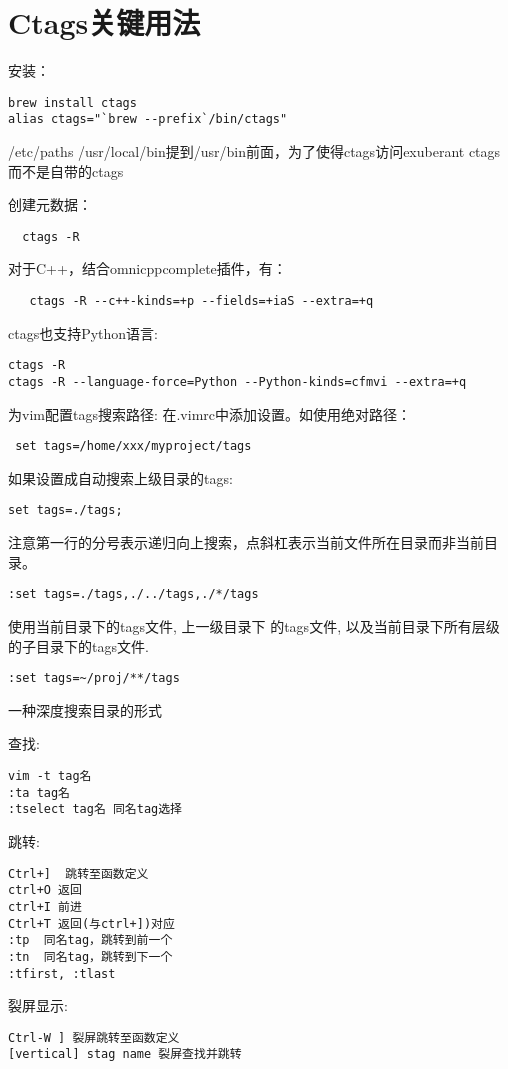 
\section{Ctags关键用法}

安装：
\begin{verbatim}
brew install ctags
alias ctags="`brew --prefix`/bin/ctags"
\end{verbatim}

/etc/paths /usr/local/bin提到/usr/bin前面，为了使得ctags访问exuberant ctags而不是自带的ctags


创建元数据：
\begin{verbatim}
  ctags -R
\end{verbatim}
  对于C++，结合omnicppcomplete插件，有：
\begin{verbatim}
   ctags -R --c++-kinds=+p --fields=+iaS --extra=+q
\end{verbatim}
ctags也支持Python语言:
\begin{verbatim}
ctags -R
ctags -R --language-force=Python --Python-kinds=cfmvi --extra=+q
\end{verbatim}

为vim配置tags搜索路径:
在.vimrc中添加设置。如使用绝对路径：
\begin{verbatim}
 set tags=/home/xxx/myproject/tags
\end{verbatim}

如果设置成自动搜索上级目录的tags:
\begin{verbatim}
set tags=./tags;
\end{verbatim}
注意第一行的分号表示递归向上搜索，点斜杠表示当前文件所在目录而非当前目录。

\begin{verbatim}
:set tags=./tags,./../tags,./*/tags
\end{verbatim}
使用当前目录下的tags文件, 上一级目录下
的tags文件, 以及当前目录下所有层级的子目录下的tags文件.


\begin{verbatim}
:set tags=~/proj/**/tags
\end{verbatim}
一种深度搜索目录的形式

查找:
\begin{verbatim}
vim -t tag名
:ta tag名
:tselect tag名 同名tag选择

\end{verbatim}

跳转:
\begin{verbatim}
Ctrl+]  跳转至函数定义
ctrl+O 返回
ctrl+I 前进
Ctrl+T 返回(与ctrl+])对应
:tp  同名tag，跳转到前一个
:tn  同名tag，跳转到下一个
:tfirst, :tlast
\end{verbatim}


裂屏显示:
\begin{verbatim}
Ctrl-W ] 裂屏跳转至函数定义
[vertical] stag name 裂屏查找并跳转
\end{verbatim}


